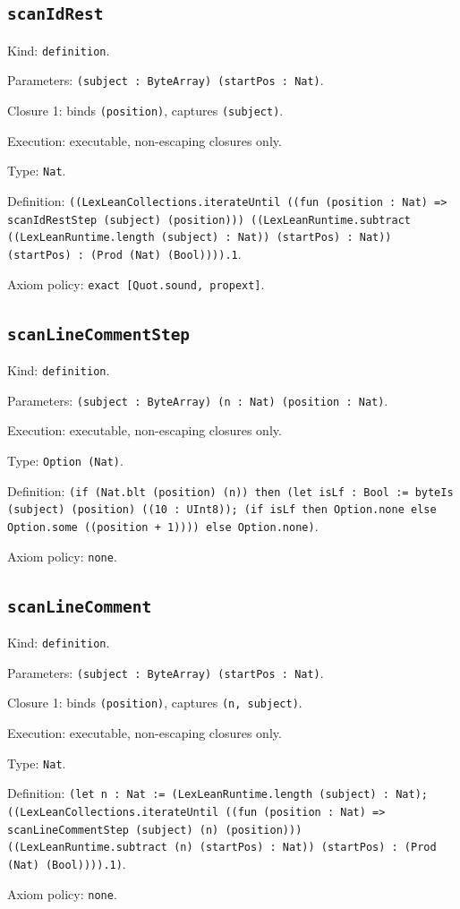\documentclass[11pt]{article}
\begin{document}
\subsection*{\texttt{scanIdRest}}
\noindent Kind: \texttt{definition}.\par
\noindent Parameters: \texttt{(subject : ByteArray) (startPos : Nat)}.\par
\noindent Closure 1: binds \texttt{(position)}, captures \texttt{(subject)}.\par
\noindent Execution: executable, non-escaping closures only.\par
\noindent Type: \texttt{Nat}.\par
\noindent Definition: \texttt{((LexLeanCollections.iterateUntil ((fun (position : Nat) => scanIdRestStep (subject) (position))) ((LexLeanRuntime.subtract ((LexLeanRuntime.length (subject) : Nat)) (startPos) : Nat)) (startPos) : (Prod (Nat) (Bool)))).1}.\par
\noindent Axiom policy: \texttt{exact [Quot.sound, propext]}.\par
\subsection*{\texttt{scanLineCommentStep}}
\noindent Kind: \texttt{definition}.\par
\noindent Parameters: \texttt{(subject : ByteArray) (n : Nat) (position : Nat)}.\par
\noindent Execution: executable, non-escaping closures only.\par
\noindent Type: \texttt{Option (Nat)}.\par
\noindent Definition: \texttt{(if (Nat.blt (position) (n)) then (let isLf : Bool := byteIs (subject) (position) ((10 : UInt8)); (if isLf then Option.none else Option.some ((position + 1)))) else Option.none)}.\par
\noindent Axiom policy: \texttt{none}.\par
\subsection*{\texttt{scanLineComment}}
\noindent Kind: \texttt{definition}.\par
\noindent Parameters: \texttt{(subject : ByteArray) (startPos : Nat)}.\par
\noindent Closure 1: binds \texttt{(position)}, captures \texttt{(n, subject)}.\par
\noindent Execution: executable, non-escaping closures only.\par
\noindent Type: \texttt{Nat}.\par
\noindent Definition: \texttt{(let n : Nat := (LexLeanRuntime.length (subject) : Nat); ((LexLeanCollections.iterateUntil ((fun (position : Nat) => scanLineCommentStep (subject) (n) (position))) ((LexLeanRuntime.subtract (n) (startPos) : Nat)) (startPos) : (Prod (Nat) (Bool)))).1)}.\par
\noindent Axiom policy: \texttt{none}.\par
\end{document}
